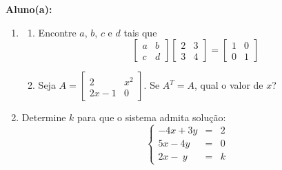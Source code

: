 \documentclass[a4paper,5pt]{amsbook}
\begin{document}
\vspace{0.5cm}
{\bf Aluno(a):}\dotfill{}  %

\vspace{0.2cm}
\begin{enumerate}
	\vspace{0.5cm}
	\item
		\begin{enumerate}
			\vspace{0.3cm}
			\item Encontre $a$, $b$, $c$ e $d$ tais que
				\[\left[\begin{array}{cc}
						a & b \\
						c & d
					\end{array}\right]
				\left[\begin{array}{cc}
						2 & 3 \\
						3 & 4
					\end{array}\right]
				=
				\left[\begin{array}{cc}
						1 & 0 \\
						0 & 1
					\end{array}\right]\]
			\vspace{0.3cm}
			\item Seja $A = \left[\begin{array}{cc}
						2 & x^2 \\
						2x-1 & 0
					\end{array}\right]$. Se $A^T = A$, qual o valor de $x$?
		\end{enumerate}

	\vspace{0.5cm}
	\item Determine $k$ para que o sistema admita solu\c{c}\~ao:
		\[\left\{\begin{array}{rcl}
				-4x + 3y & = & 2 \\
				 5x - 4y & = & 0 \\
				 2x -\ y & = & k
			\end{array}\right.\]


\end{enumerate}
\end{document}
